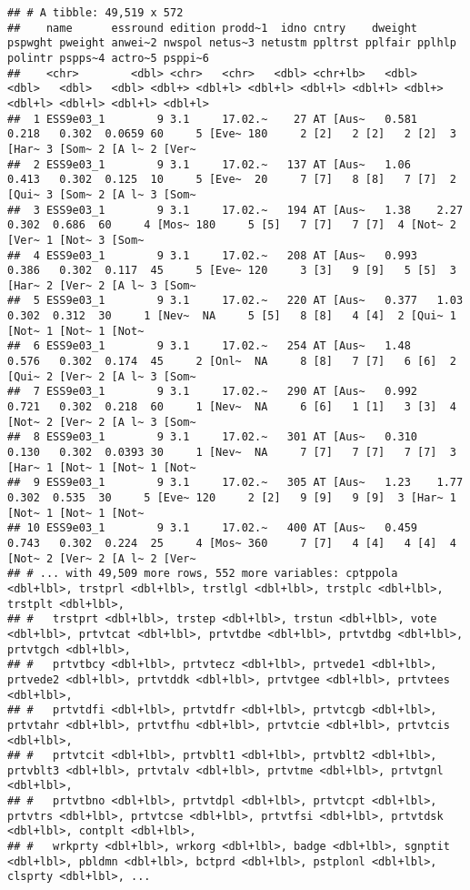 \documentclass[
]{book}
\begin{document}
\begin{verbatim}
## # A tibble: 49,519 x 572
##    name      essround edition prodd~1  idno cntry    dweight pspwght pweight anwei~2 nwspol netus~3 netustm ppltrst pplfair pplhlp polintr pspps~4 actro~5 psppi~6
##    <chr>        <dbl> <chr>   <chr>   <dbl> <chr+lb>   <dbl>   <dbl>   <dbl>   <dbl> <dbl+> <dbl+l> <dbl+l> <dbl+l> <dbl+l> <dbl+> <dbl+l> <dbl+l> <dbl+l> <dbl+l>
##  1 ESS9e03_1        9 3.1     17.02.~    27 AT [Aus~   0.581   0.218   0.302  0.0659 60     5 [Eve~ 180     2 [2]   2 [2]   2 [2]  3 [Har~ 3 [Som~ 2 [A l~ 2 [Ver~
##  2 ESS9e03_1        9 3.1     17.02.~   137 AT [Aus~   1.06    0.413   0.302  0.125  10     5 [Eve~  20     7 [7]   8 [8]   7 [7]  2 [Qui~ 3 [Som~ 2 [A l~ 3 [Som~
##  3 ESS9e03_1        9 3.1     17.02.~   194 AT [Aus~   1.38    2.27    0.302  0.686  60     4 [Mos~ 180     5 [5]   7 [7]   7 [7]  4 [Not~ 2 [Ver~ 1 [Not~ 3 [Som~
##  4 ESS9e03_1        9 3.1     17.02.~   208 AT [Aus~   0.993   0.386   0.302  0.117  45     5 [Eve~ 120     3 [3]   9 [9]   5 [5]  3 [Har~ 2 [Ver~ 2 [A l~ 3 [Som~
##  5 ESS9e03_1        9 3.1     17.02.~   220 AT [Aus~   0.377   1.03    0.302  0.312  30     1 [Nev~  NA     5 [5]   8 [8]   4 [4]  2 [Qui~ 1 [Not~ 1 [Not~ 1 [Not~
##  6 ESS9e03_1        9 3.1     17.02.~   254 AT [Aus~   1.48    0.576   0.302  0.174  45     2 [Onl~  NA     8 [8]   7 [7]   6 [6]  2 [Qui~ 2 [Ver~ 2 [A l~ 3 [Som~
##  7 ESS9e03_1        9 3.1     17.02.~   290 AT [Aus~   0.992   0.721   0.302  0.218  60     1 [Nev~  NA     6 [6]   1 [1]   3 [3]  4 [Not~ 2 [Ver~ 2 [A l~ 3 [Som~
##  8 ESS9e03_1        9 3.1     17.02.~   301 AT [Aus~   0.310   0.130   0.302  0.0393 30     1 [Nev~  NA     7 [7]   7 [7]   7 [7]  3 [Har~ 1 [Not~ 1 [Not~ 1 [Not~
##  9 ESS9e03_1        9 3.1     17.02.~   305 AT [Aus~   1.23    1.77    0.302  0.535  30     5 [Eve~ 120     2 [2]   9 [9]   9 [9]  3 [Har~ 1 [Not~ 1 [Not~ 1 [Not~
## 10 ESS9e03_1        9 3.1     17.02.~   400 AT [Aus~   0.459   0.743   0.302  0.224  25     4 [Mos~ 360     7 [7]   4 [4]   4 [4]  4 [Not~ 2 [Ver~ 2 [A l~ 2 [Ver~
## # ... with 49,509 more rows, 552 more variables: cptppola <dbl+lbl>, trstprl <dbl+lbl>, trstlgl <dbl+lbl>, trstplc <dbl+lbl>, trstplt <dbl+lbl>,
## #   trstprt <dbl+lbl>, trstep <dbl+lbl>, trstun <dbl+lbl>, vote <dbl+lbl>, prtvtcat <dbl+lbl>, prtvtdbe <dbl+lbl>, prtvtdbg <dbl+lbl>, prtvtgch <dbl+lbl>,
## #   prtvtbcy <dbl+lbl>, prtvtecz <dbl+lbl>, prtvede1 <dbl+lbl>, prtvede2 <dbl+lbl>, prtvtddk <dbl+lbl>, prtvtgee <dbl+lbl>, prtvtees <dbl+lbl>,
## #   prtvtdfi <dbl+lbl>, prtvtdfr <dbl+lbl>, prtvtcgb <dbl+lbl>, prtvtahr <dbl+lbl>, prtvtfhu <dbl+lbl>, prtvtcie <dbl+lbl>, prtvtcis <dbl+lbl>,
## #   prtvtcit <dbl+lbl>, prtvblt1 <dbl+lbl>, prtvblt2 <dbl+lbl>, prtvblt3 <dbl+lbl>, prtvtalv <dbl+lbl>, prtvtme <dbl+lbl>, prtvtgnl <dbl+lbl>,
## #   prtvtbno <dbl+lbl>, prtvtdpl <dbl+lbl>, prtvtcpt <dbl+lbl>, prtvtrs <dbl+lbl>, prtvtcse <dbl+lbl>, prtvtfsi <dbl+lbl>, prtvtdsk <dbl+lbl>, contplt <dbl+lbl>,
## #   wrkprty <dbl+lbl>, wrkorg <dbl+lbl>, badge <dbl+lbl>, sgnptit <dbl+lbl>, pbldmn <dbl+lbl>, bctprd <dbl+lbl>, pstplonl <dbl+lbl>, clsprty <dbl+lbl>, ...
\end{verbatim}
\end{document}
